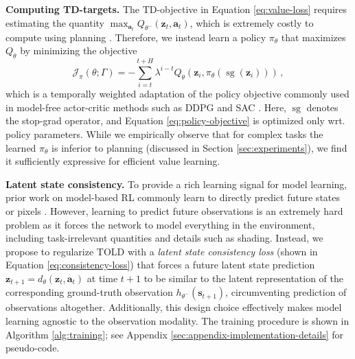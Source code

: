 \documentclass{article}
\begin{document}
\textbf{Computing TD-targets.} The TD-objective in Equation \ref{eq:value-loss} requires estimating the quantity $\max_{\mathbf{a}_{t}} Q_{\theta^{-}}(\mathbf{z}_{t}, \mathbf{a}_{t})$, which is extremely costly to compute using planning \citep{Lowrey2019PlanOL}. Therefore, we instead learn a policy $\pi_{\theta}$ that maximizes $Q_{\theta}$ by minimizing the objective
\begin{equation}
    \label{eq:policy-objective}
    \mathcal{J}_{\pi}(\theta; \Gamma) = - \sum_{i=t}^{t+H} \lambda^{i-t} Q_{\theta}(\mathbf{z}_{i}, \pi_{\theta}(\operatorname{sg}(\mathbf{z}_{i})))\,,
\end{equation}
which is a temporally weighted adaptation of the policy objective commonly used in model-free actor-critic methods such as DDPG \cite{Lillicrap2016ContinuousCW} and SAC \cite{Haarnoja2018SoftAA}. Here, $\operatorname{sg}$ denotes the stop-grad operator, and Equation \ref{eq:policy-objective} is optimized only wrt. policy parameters. While we empirically observe that for complex tasks the learned $\pi_{\theta}$ is inferior to planning (discussed in Section \ref{sec:experiments}), we find it sufficiently expressive for efficient value learning.

\textbf{Latent state consistency.} To provide a rich learning signal for model learning, prior work on model-based RL commonly learn to directly predict future states or pixels \citep{ha2018worldmodels, Janner2019WhenTT, Lowrey2019PlanOL, Kaiser2020ModelBasedRL, Sikchi2020LearningOW}. However, learning to predict future observations is an extremely hard problem as it forces the network to model everything in the environment, including task-irrelevant quantities and details such as shading.
Instead, we propose to regularize TOLD with a \textit{latent state consistency loss} (shown in Equation \ref{eq:consistency-loss}) that forces a future latent state prediction $\mathbf{z}_{t+1} = d_{\theta}(\mathbf{z}_{t}, \mathbf{a}_{t})$ at time $t+1$ to be similar to the latent representation of the corresponding ground-truth observation $h_{\theta^{-}}(\mathbf{s}_{t+1})$, circumventing prediction of observations altogether. Additionally, this design choice effectively makes model learning agnostic to the observation modality. The training procedure is shown in Algorithm \ref{alg:training}; see Appendix \ref{sec:appendix-implementation-details} for pseudo-code.
\end{document}
